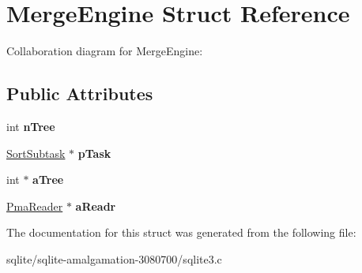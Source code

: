 \hypertarget{struct_merge_engine}{\section{Merge\+Engine Struct Reference}
\label{struct_merge_engine}
}


Collaboration diagram for Merge\+Engine\+:
\subsection*{Public Attributes}
\begin{DoxyCompactItemize}
\item 
\hypertarget{struct_merge_engine_a48d8ad99ae5063e96458b5563ff2bbd3}{int {\bfseries n\+Tree}}\label{struct_merge_engine_a48d8ad99ae5063e96458b5563ff2bbd3}

\item 
\hypertarget{struct_merge_engine_a0a366796f579aa7befcb2683ff767c0d}{\hyperlink{struct_sort_subtask}{Sort\+Subtask} $\ast$ {\bfseries p\+Task}}\label{struct_merge_engine_a0a366796f579aa7befcb2683ff767c0d}

\item 
\hypertarget{struct_merge_engine_aac39bb928db1c72c48db263e0937b285}{int $\ast$ {\bfseries a\+Tree}}\label{struct_merge_engine_aac39bb928db1c72c48db263e0937b285}

\item 
\hypertarget{struct_merge_engine_a897688db3212c8b3049a57cda6f2f975}{\hyperlink{struct_pma_reader}{Pma\+Reader} $\ast$ {\bfseries a\+Readr}}\label{struct_merge_engine_a897688db3212c8b3049a57cda6f2f975}

\end{DoxyCompactItemize}


The documentation for this struct was generated from the following file\+:\begin{DoxyCompactItemize}
\item 
sqlite/sqlite-\/amalgamation-\/3080700/sqlite3.\+c\end{DoxyCompactItemize}
